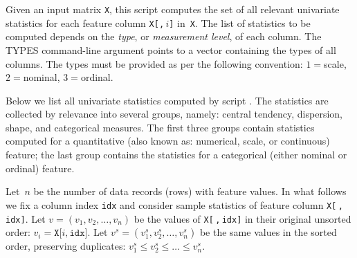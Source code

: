 \pagebreak[1]

\smallskip
{}
\smallskip

Given an input matrix \texttt{X}, this script computes the set of all
relevant univariate statistics for each feature column \texttt{X[,$\,i$]}
in~\texttt{X}.  The list of statistics to be computed depends on the
\emph{type}, or \emph{measurement level}, of each column.
The \textrm{TYPES} command-line argument points to a vector containing
the types of all columns.  The types must be provided as per the following
convention: $1 = {}$scale, $2 = {}$nominal, $3 = {}$ordinal.

Below we list all univariate statistics computed by script \UnivarScriptName.
The statistics are collected by relevance into several groups, namely: central
tendency, dispersion, shape, and categorical measures.  The first three groups
contain statistics computed for a quantitative (also known as: numerical, scale,
or continuous) feature; the last group contains the statistics for a categorical
(either nominal or ordinal) feature.  

Let~$n$ be the number of data records (rows) with feature values.
In what follows we fix a column index \texttt{idx} and consider
sample statistics of feature column \texttt{X[}$\,$\texttt{,}$\,$\texttt{idx]}.
Let $v = (v_1, v_2, \ldots, v_n)$ be the values of \texttt{X[}$\,$\texttt{,}$\,$\texttt{idx]}
in their original unsorted order: $v_i = \texttt{X[}i\texttt{,}\,\texttt{idx]}$.
Let $v^s = (v^s_1, v^s_2, \ldots, v^s_n)$ be the same values in the sorted order,
preserving duplicates: $v^s_1 \leq v^s_2 \leq \ldots \leq v^s_n$.

